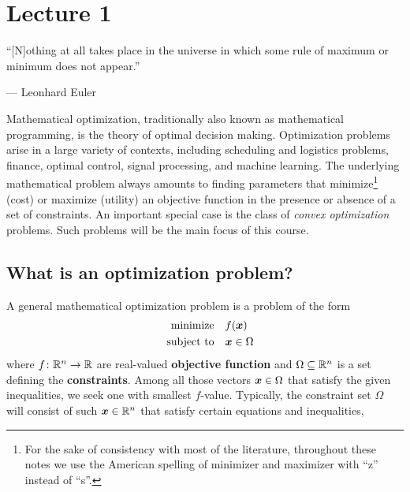 %
%
% 


\chapter*{Lecture 1}
\addtocounter{chapter}{1}

\epigraph{``[N]othing at all takes place in the universe in which some rule of maximum or minimum does not appear.''}{--- \textup{Leonhard Euler}}

Mathematical optimization, traditionally also known as mathematical programming, is the theory of optimal decision making. Optimization problems arise in a large variety of contexts, including scheduling and logistics problems, finance, optimal control, signal processing, and machine learning. The underlying mathematical problem always amounts to finding parameters that minimize\footnote{For the sake of consistency with most of the literature, throughout these notes we use the American spelling of minimizer and maximizer with ``z'' instead of ``s''.} (cost) or maximize (utility) an objective function in the presence or absence of a set of constraints. An important special case is the class of {\em convex optimization} problems. Such problems will be the main focus of this course.

\section{What is an optimization problem?}
A general mathematical optimization problem is a problem of the form
\begin{align}\label{eq:opt-form}
\begin{split}
 \text{minimize}\quad & f(\bm{x})\\
 \quad\text{subject to}\quad & \bm{x}\in \Omega
 \end{split}
\end{align}
where $f\colon \mathbb{R}^n\to \mathbb{R}$ are real-valued \textbf{objective function} and $\Omega\subseteq \mathbb{R}^n$ is a set defining the \textbf{constraints}.
Among all those vectors $\bm{x}\in \Omega$ that satisfy the given inequalities, we seek one with smallest $f$-value. Typically, the constraint set $\Omega$ will consist of such $\bm{x}\in \mathbb{R}^n$ that satisfy certain equations and inequalities,

